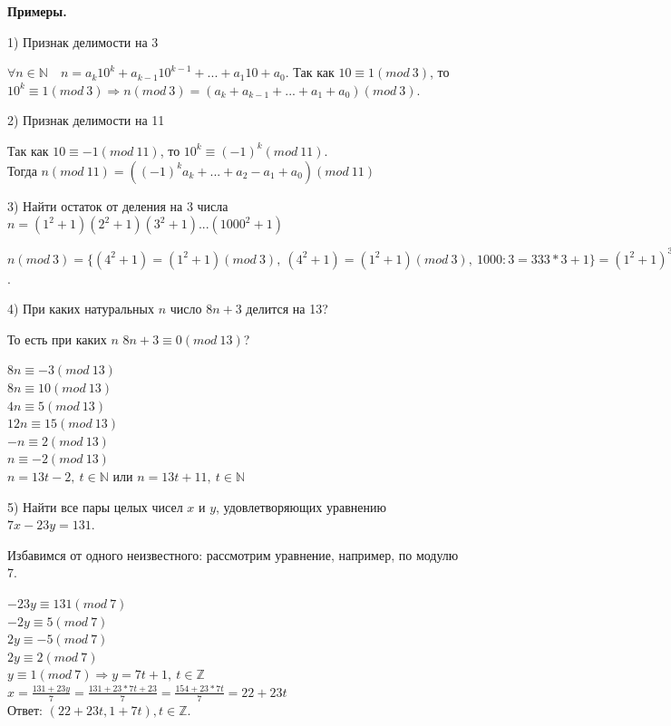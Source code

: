 \documentclass{article}
\begin{document}
            \textbf{Примеры.}

            1) Признак делимости на 3

            \( \forall n \in \mathbb{N}\quad n = a_k10^k + a_{k - 1}10^{k - 1} + ... + a_1 10 + a_0 \). Так как \(10 \equiv 1 (mod\ 3)\), то \(10^k \equiv 1 (mod\ 3) \Rightarrow n(mod\ 3) = (a_k + a_{k - 1} + ... + a_1 + a_0)(mod\ 3)\).

            2) Признак делимости на 11

            Так как \( 10 \equiv -1 (mod\ 11) \), то \( 10^k \equiv (-1)^k(mod\ 11) \).\\
            Тогда \( n(mod\ 11) = ((-1)^ka_k + ... + a_2 - a_1 + a_0)(mod\ 11) \)

            3) Найти остаток от деления на 3 числа \( n = (1^2 + 1)(2^2 + 1)(3^2 + 1)...(1000^2 + 1) \)

            \( n(mod\ 3) = \{(4^2 + 1) = (1^2 + 1)(mod\ 3),\ (4^2 + 1) = (1^2 + 1)(mod\ 3),\ 1000:3 = 333*3 + 1 \} = (1^2 + 1)^{334}(2^2 + 1)^{333}(3^2 + 1)^{333}(mod\ 3) \equiv (2)^{334}(2)^{333}(1)^{333}(mod\ 3) \equiv (2)^{667}(mod\ 3) \equiv (-1)^{667}(mod\ 3) \equiv -1(mod\ 3) \equiv 2(mod\ 3) \).

            4) При каких натуральных \(n\) число \(8n + 3\) делится на 13?

            То есть при каких \(n\) \(8n + 3 \equiv 0(mod\ 13)\)?

            \( 8n \equiv -3(mod\ 13) \)\\
            \( 8n \equiv 10(mod\ 13) \)\\
            \( 4n \equiv 5(mod\ 13) \)\\
            \( 12n \equiv 15(mod\ 13) \)\\
            \( -n \equiv 2(mod\ 13) \)\\
            \( n \equiv -2(mod\ 13) \)\\
            \( n = 13t - 2,\ t \in \mathbb{N} \) или \( n = 13t + 11,\ t \in \mathbb{N} \)

            5) Найти все пары целых чисел \(x\) и \(y\), удовлетворяющих уравнению \(7x - 23y = 131\).

            Избавимся от одного неизвестного: рассмотрим уравнение, например, по модулю 7.

            \( -23y \equiv 131(mod\ 7) \)\\
            \( -2y \equiv 5(mod\ 7) \)\\
            \( 2y \equiv -5(mod\ 7) \)\\
            \( 2y \equiv 2(mod\ 7) \)\\
            \( y \equiv 1(mod\ 7) \Rightarrow y = 7t + 1,\ t \in \mathbb{Z} \)\\
            \( x = \frac{131 + 23y}{7} = \frac{131 + 23*7t + 23}{7} = \frac{154 + 23*7t}{7} = 22 + 23t \)\\
            Ответ: \( (22 + 23t, 1 + 7t), t \in \mathbb{Z} \).
          
\end{document}

